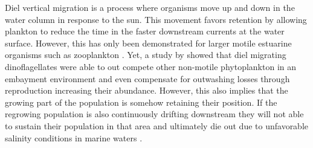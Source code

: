 \documentclass[npg, manuscript]{copernicus}
\begin{document}
Diel vertical migration is a process where organisms move up and down in the water column in response to the sun.
This movement favors retention by allowing plankton to reduce the time in the faster downstream currents at the water surface.
However, this has only been demonstrated for larger motile estuarine organisms such as zooplankton \citep{Hall2015, Kimmerer2002, Crawford1991,Hall2011}.
Yet, a study by \citet{Anderson1985} showed that diel migrating dinoflagellates were able to out compete other non-motile phytoplankton in an embayment environment and even compensate for outwashing losses through reproduction increasing their abundance.
However, this also implies that the growing part of the population is somehow retaining their position.
If the regrowing population is also continuously drifting downstream they will not able to sustain their population in that area and ultimately die out due to unfavorable salinity conditions in marine waters \citep{Admiraal1976, vonAlvensleben2016, Jiang2020}.
\end{document}

